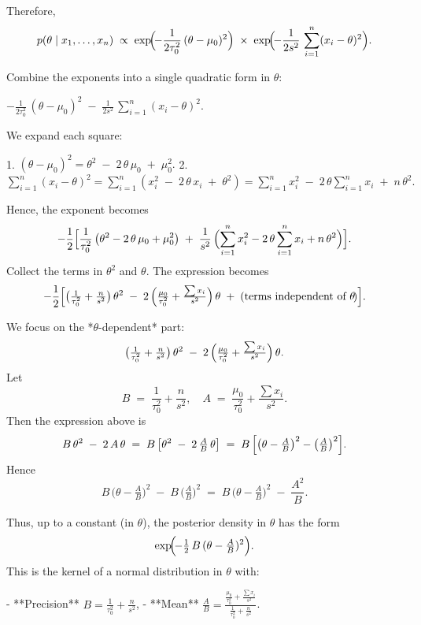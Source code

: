 Therefore,
\[
p(\theta \mid x_1,\dots,x_n)
\;\propto\;
\exp\!\Bigl(\!-\frac{1}{2\tau_0^2}\,(\theta - \mu_0)^2\Bigr)
\;\times\;
\exp\!\Bigl(\!-\frac{1}{2s^2}\,\sum_{i=1}^n (x_i - \theta)^2\Bigr).
\]

Combine the exponents into a single quadratic form in \(\theta\):

\(
-\frac{1}{2\tau_0^2}\,(\theta - \mu_0)^2
\;-\;
\frac{1}{2s^2}\,\sum_{i=1}^n (x_i - \theta)^2.
\)

We expand each square:

1. \((\theta - \mu_0)^2 = \theta^2 \;-\; 2\,\theta\,\mu_0 \;+\; \mu_0^2.\)
2. \(\sum_{i=1}^n (x_i - \theta)^2
   = \sum_{i=1}^n (x_i^2 \;-\; 2\,\theta\,x_i \;+\; \theta^2)
   = \sum_{i=1}^n x_i^2 \;-\; 2\,\theta\sum_{i=1}^n x_i \;+\; n\,\theta^2.\)

Hence, the exponent becomes
\[
-\frac{1}{2}\Bigl[
\frac{1}{\tau_0^2}\,\bigl(\theta^2 - 2\,\theta\,\mu_0 + \mu_0^2\bigr)
\;+\;
\frac{1}{s^2}\,\Bigl(\sum_{i=1}^n x_i^2 - 2\,\theta\sum_{i=1}^n x_i + n\,\theta^2\Bigr)
\Bigr].
\]
Collect the terms in \(\theta^2\) and \(\theta\). The expression becomes
\[
-\frac{1}{2}\Bigl[
\bigl(\tfrac{1}{\tau_0^2} + \tfrac{n}{s^2}\bigr)\,\theta^2
\;-\;
2\,\Bigl(\tfrac{\mu_0}{\tau_0^2} + \tfrac{\sum x_i}{s^2}\Bigr)\,\theta
\;+\;
\text{(terms independent of }\theta\!)\Bigr].
\]

We focus on the *\(\theta\)-dependent* part:
\[
\bigl(\tfrac{1}{\tau_0^2} + \tfrac{n}{s^2}\bigr)\,\theta^2
\;-\;
2\,\Bigl(\tfrac{\mu_0}{\tau_0^2} + \tfrac{\sum x_i}{s^2}\Bigr)\,\theta.
\]
Let
\[
B \;=\; \frac{1}{\tau_0^2} + \frac{n}{s^2},
\quad
A \;=\; \frac{\mu_0}{\tau_0^2} + \frac{\sum x_i}{s^2}.
\]
Then the expression above is
\[
B\,\theta^2 \;-\; 2\,A\,\theta
\;=\;
B\,\bigl[\theta^2 \;-\; 2\,\tfrac{A}{B}\,\theta\bigr]
\;=\;
B\,\Bigl[\bigl(\theta - \tfrac{A}{B}\bigr)^2 - \bigl(\tfrac{A}{B}\bigr)^2\Bigr].
\]
Hence
\[
B\,\bigl(\theta - \tfrac{A}{B}\bigr)^2
\;-\;
B\,\bigl(\tfrac{A}{B}\bigr)^2
\;=\;
B\,\bigl(\theta - \tfrac{A}{B}\bigr)^2
\;-\;
\frac{A^2}{B}.
\]

Thus, up to a constant (in \(\theta\)), the posterior density in \(\theta\) has the form
\[
\exp\!\Bigl(\!-\tfrac{1}{2}\,B\,(\theta - \tfrac{A}{B})^2\Bigr).
\]
This is the kernel of a normal distribution in \(\theta\) with:

- **Precision** \(B = \frac{1}{\tau_0^2} + \frac{n}{s^2}\),
- **Mean** \(\frac{A}{B} = \frac{\tfrac{\mu_0}{\tau_0^2} + \tfrac{\sum x_i}{s^2}}
                                 {\tfrac{1}{\tau_0^2} + \tfrac{n}{s^2}}\).

